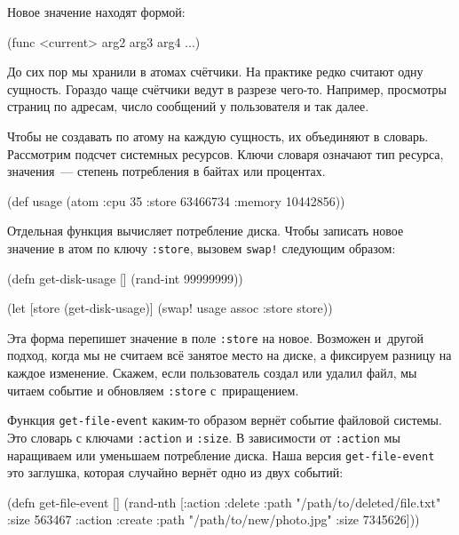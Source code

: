 \noindent
Новое значение находят формой:

\begin{english}
  \begin{clojure}
(func <current> arg2 arg3 arg4 ...)
  \end{clojure}
\end{english}

До сих пор мы хранили в атомах счётчики. На практике редко считают одну
сущность. Гораздо чаще счётчики ведут в разрезе чего-то. Например, просмотры
страниц по адресам, число сообщений у пользователя и так далее.

Чтобы не создавать по атому на каждую сущность, их объединяют в
словарь. Рассмотрим подсчет системных ресурсов. Ключи словаря означают тип
ресурса, значения~--- степень потребления в байтах или процентах.

\begin{english}
  \begin{clojure}
(def usage
  (atom {:cpu 35
         :store 63466734
         :memory 10442856}))
  \end{clojure}
\end{english}

Отдельная функция вычисляет потребление диска. Чтобы записать новое значение в
атом по ключу \verb|:store|, вызовем \verb|swap!| следующим образом:

\begin{english}
  \begin{clojure}
(defn get-disk-usage []
  (rand-int 99999999))

(let [store (get-disk-usage)]
  (swap! usage assoc :store store))
  \end{clojure}
\end{english}

Эта форма перепишет значение в поле \verb|:store| на новое. Возможен и~другой
подход, когда мы не считаем всё занятое место на диске, а фиксируем разницу на
каждое изменение. Скажем, если пользователь создал или удалил файл, мы читаем
событие и обновляем \verb|:store| с~приращением.

Функция \verb|get-file-event| каким-то образом вернёт событие файловой
системы. Это словарь с ключами \verb|:action| и \verb|:size|. В зависимости
от \verb|:action| мы наращиваем или уменьшаем потребление диска. Наша версия
\verb|get-file-event| это заглушка, которая случайно вернёт одно из двух
событий:

\begin{english}
  \begin{clojure}
(defn get-file-event []
  (rand-nth
   [{:action :delete
     :path "/path/to/deleted/file.txt"
     :size 563467}
    {:action :create
     :path "/path/to/new/photo.jpg"
     :size 7345626}]))
  \end{clojure}
\end{english}


